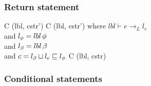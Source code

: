 \subsubsection{Return statement}

\begin{trules}
        { {C} {(lbl, cstr')} }
        { {C} {(lbl, cstr')} }
        {where $lbl \vdash e \rightarrow_L l_e$\\
          and $l_\phi = lbl \, \phi$\\
          and $l_\beta = lbl \, \beta$\\
          and $c = l_\beta \sqcup l_e \sqsubseteq l_\phi$}
        { {C} {(lbl, cstr)} }
        {}
        {}
        {}
\end{trules}

\subsubsection{Conditional statements}

